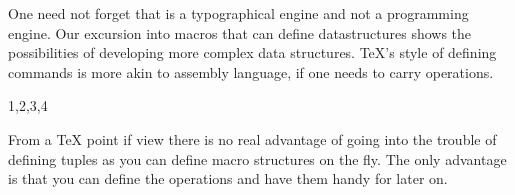 One need not forget that \tex is a typographical engine and not a programming engine. Our excursion into macros that can define datastructures shows the possibilities of developing more complex data structures. TeX's style of defining commands is more akin to assembly language, if one needs to carry operations.

\begin{teXXX}
\def\deftuple#1{}
\def\showtuple#1{}
\def\gettupleelement#1#2{}
\def\addtuple#1#2{}
\end{teXXX}


\begin{teXXX}
\def\deftuple#1#2{%
  \expandafter\def\csname#1\endcsname{#2}
}
\deftuple{test}{1,2,3,4}
\test
\end{teXXX}

From a TeX point if view there is no real advantage of going into the trouble of defining tuples as you can define macro structures on the fly. The only advantage is that you can define the operations and have them handy for later on.






























